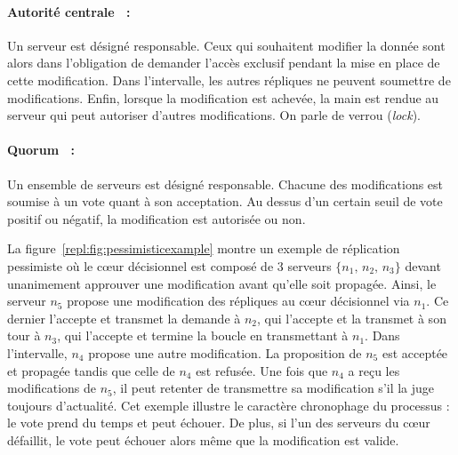 \paragraph{Autorité centrale~\cite{alsberg1976principle} :} Un serveur est
désigné responsable. Ceux qui souhaitent modifier la donnée sont alors dans
l'obligation de demander l'accès exclusif pendant la mise en place de cette
modification. Dans l'intervalle, les autres répliques ne peuvent soumettre de
modifications. Enfin, lorsque la modification est achevée, la main est rendue au
serveur qui peut autoriser d'autres modifications. On parle de verrou
(\emph{lock}).

\paragraph{Quorum~\cite{gifford1979weighted} :} Un ensemble de serveurs est
désigné responsable. Chacune des modifications est soumise à un vote quant à son
acceptation. Au dessus d'un certain seuil de vote positif ou négatif, la
modification est autorisée ou non.



\begin{figure*}
  \centering
  \hspace{40pt}
  \hspace{10pt}
  \caption{\label{repl:fig:pessimisticexample} Exemple de quorum en réplication
    pessimiste. La modification de $n_5$ est propagée.}
\end{figure*}

La figure~\ref{repl:fig:pessimisticexample} montre un exemple de réplication
pessimiste où le cœur décisionnel est composé de 3 serveurs
$\{n_1,\, n_2,\, n_3\}$ devant unanimement approuver une modification avant
qu'elle soit propagée. Ainsi, le serveur $n_5$ propose une modification des
répliques au cœur décisionnel via $n_1$. Ce dernier l'accepte et transmet la
demande à $n_2$, qui l'accepte et la transmet à son tour à $n_3$, qui l'accepte
et termine la boucle en transmettant à $n_1$.  Dans l'intervalle, $n_4$ propose
une autre modification. La proposition de $n_5$ est acceptée et propagée tandis
que celle de $n_4$ est refusée. Une fois que $n_4$ a reçu les modifications de
$n_5$, il peut retenter de transmettre sa modification s'il la juge toujours
d'actualité. Cet exemple illustre le caractère chronophage du processus : le
vote prend du temps et peut échouer. De plus, si l'un des serveurs du cœur
défaillit, le vote peut échouer alors même que la modification est valide.

